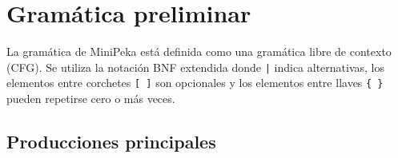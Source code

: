 \documentclass[12pt]{article}
\begin{document}
\section{Gramática preliminar}

La gramática de MiniPeka está definida como una gramática libre de contexto
(CFG). Se utiliza la notación BNF extendida donde \texttt{|} indica
alternativas, los elementos entre corchetes \texttt{[ ]} son opcionales y
los elementos entre llaves \texttt{\{ \}} pueden repetirse cero o más veces.

\subsection{Producciones principales}
\end{document}
